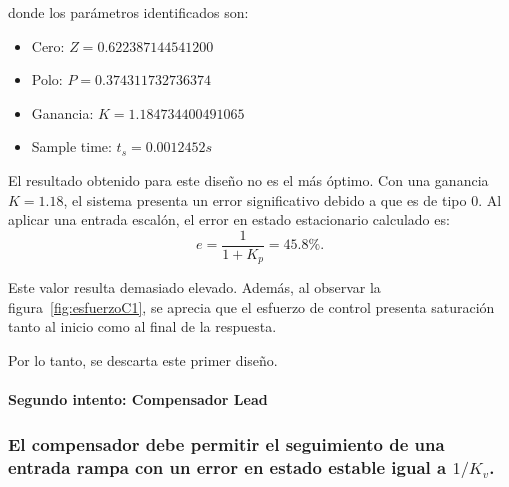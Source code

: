 \noindent
donde los parámetros identificados son:
\begin{itemize}
	\item Cero: $Z = 0.622387144541200$
	\item Polo: $P = 0.374311732736374$
	\item Ganancia: $K = 1.184734400491065$
	\item Sample time: $t_s = 0.0012452 s$
\end{itemize}




El resultado obtenido para este diseño no es el más óptimo. Con una ganancia $K = 1.18$, el sistema presenta un error significativo debido a que es de tipo $0$. Al aplicar una entrada escalón, el error en estado estacionario calculado es:
\[
e = \frac{1}{1+K_p} = 45.8\%.
\]

Este valor resulta demasiado elevado. Además, al observar la figura~\ref{fig:esfuerzoC1}, se aprecia que el esfuerzo de control presenta saturación tanto al inicio como al final de la respuesta.  

Por lo tanto, se descarta este primer diseño.
\paragraph{Segundo intento: Compensador Lead}

\subsubsection{El compensador debe permitir el seguimiento de una entrada rampa con un error en estado estable igual a $1/K_v$.}


